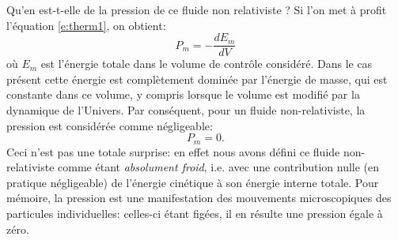 Qu'en est-t-elle de la pression de ce fluide non relativiste ? Si l'on met à profit l'équation \ref{e:therm1}, on obtient:
\begin{equation}
P_m=-\frac{dE_m}{dV}
\end{equation}
où $E_m$ est l'énergie totale dans le volume de contrôle considéré. Dans le cas présent cette énergie est complètement dominée par l'énergie de masse, qui est constante dans ce volume, y compris lorsque le volume est modifié par la dynamique de l'Univers. Par conséquent, pour un fluide non-relativiste, la pression est considérée comme négligeable:
\begin{equation}
P_m=0.
\end{equation}
Ceci n'est pas une totale surprise: en effet nous avons défini ce fluide non-relativiste comme étant \textit{absolument froid}, i.e. avec une contribution nulle (en pratique négligeable) de l'énergie cinétique à son énergie interne totale. Pour mémoire, la pression est une manifestation des mouvements microscopiques des particules individuelles: celles-ci étant figées, il en résulte une pression égale à zéro.

